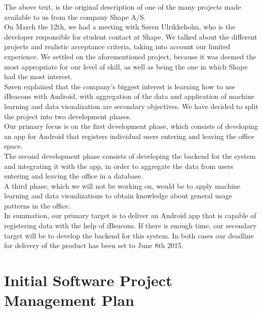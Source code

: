 \documentclass[12pt]{article}
\begin{document}
The above text, is the original description of one of the many projects made available to us from the company Shape A/S.\\

On March the 12th, we had a meeting with S\o ren Ulrikkeholm, who is the developer responsible for student contact at Shape. We talked about the different projects and realistic acceptance criteria, taking into account our limited experience. We settled on the aforementioned project, because it was deemed the most appropriate for our level of skill, as well as being the one in which Shape had the most interest.\\

S\o ren explained that the company's biggest interest is learning how to use iBeacons with Android, with aggregation of the data and application of machine learning and data visualization are secondary objectives. We have decided to split the project into two development phases.\\

Our primary focus is on the first development phase, which consists of developing an app for Android that registers individual users entering and leaving the office space.\\

The second development phase consists of developing the backend for the system and integrating it with the app, in order to aggregate the data from users entering and leaving the office in a database.\\
A third phase, which we will not be working on, would be to apply machine learning and data visualizations to obtain knowledge about general usage patterns in the office.\\

In summation, our primary target is to deliver an Android app that is capable of registering data with the help of iBeacons. If there is enough time, our secondary target will be to develop the backend for this system. In both cases our deadline for delivery of the product has been set to June 8th 2015.\\










\section{Initial Software Project Management Plan}
\end{document}
